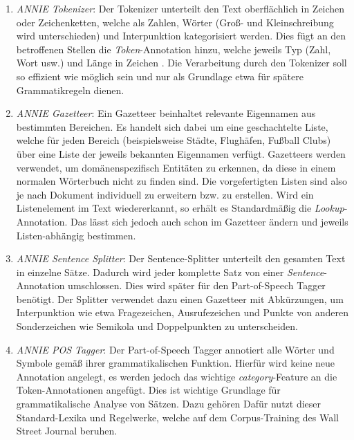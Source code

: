\documentclass[12pt]{report}
\begin{document}
\begin{enumerate}
\item \textit{ANNIE Tokenizer}: Der Tokenizer unterteilt den Text oberflächlich in Zeichen oder Zeichenketten, welche als Zahlen, Wörter (Groß- und Kleinschreibung wird unterschieden) und Interpunktion kategorisiert werden. Dies fügt an den betroffenen Stellen die \textit{Token}-Annotation hinzu, welche jeweils Typ (Zahl, Wort usw.) und Länge in Zeichen . Die Verarbeitung durch den Tokenizer soll so effizient wie möglich sein und nur als Grundlage etwa für spätere Grammatikregeln dienen.

\item \textit{ANNIE Gazetteer}: Ein Gazetteer beinhaltet relevante Eigennamen aus bestimmten Bereichen. Es handelt sich dabei um eine geschachtelte Liste, welche für jeden Bereich (beispielsweise Städte, Flughäfen, Fußball Clubs) über eine Liste der jeweils bekannten Eigennamen verfügt. Gazetteers werden verwendet, um domänenspezifisch Entitäten zu erkennen, da diese in einem normalen Wörterbuch nicht zu finden sind. Die vorgefertigten Listen sind also je nach Dokument individuell zu erweitern bzw. zu erstellen. Wird ein Listenelement im Text wiedererkannt, so erhält es Standardmäßig die \textit{Lookup}-Annotation. Das lässt sich jedoch auch schon im Gazetteer ändern und jeweils Listen-abhängig bestimmen. 

\item \textit{ANNIE Sentence Splitter}: Der Sentence-Splitter unterteilt den gesamten Text in einzelne Sätze. Dadurch wird jeder komplette Satz von einer \textit{Sentence}-Annotation umschlossen. Dies wird später für den Part-of-Speech Tagger benötigt. Der Splitter verwendet dazu einen Gazetteer mit Abkürzungen, um Interpunktion wie etwa Fragezeichen, Ausrufezeichen und Punkte von anderen Sonderzeichen wie Semikola und Doppelpunkten zu unterscheiden. 

\item \textit{ANNIE POS Tagger}: Der Part-of-Speech Tagger annotiert alle Wörter und Symbole gemäß ihrer grammatikalischen Funktion. Hierfür wird keine neue Annotation angelegt, es werden jedoch das wichtige \textit{category}-Feature an die Token-Annotationen angefügt. Dies ist wichtige Grundlage für grammatikalische Analyse von Sätzen. Dazu gehören Dafür nutzt dieser Standard-Lexika und Regelwerke, welche auf dem Corpus-Training des Wall Street Journal beruhen.
\end{enumerate}
\end{document}
